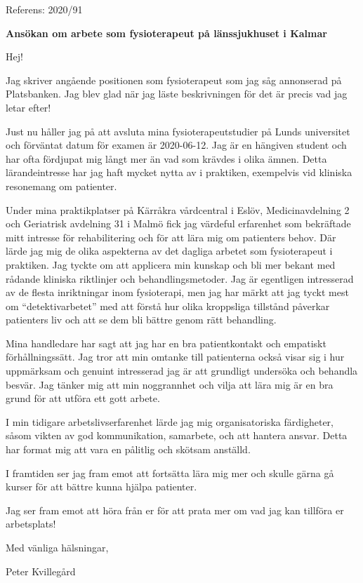 \documentclass[10pt,a4paper]{letter}
\begin{document}
 
	\begin{letter}{Referens: 2020/91} 
		
\opening{\textbf{Ansökan om arbete som fysioterapeut på länssjukhuset i Kalmar}}
Hej!

Jag skriver angående positionen som fysioterapeut som jag såg annonserad på Platsbanken. Jag blev glad när jag läste beskrivningen för det är precis vad jag letar efter!

Just nu håller jag på att avsluta mina fysioterapeutstudier på Lunds universitet och förväntat \mbox{datum} för examen är 2020-06-12. Jag är en hängiven student och har ofta fördjupat mig långt mer än vad som krävdes i olika ämnen. Detta lärande\-intresse har jag haft mycket nytta av i praktiken, exempelvis vid kliniska resonemang om patienter.

Under mina praktikplatser på Kärråkra vårdcentral i Eslöv, Medicinavdelning 2 och Geriatrisk avdelning 31 i Malmö fick jag värdeful erfarenhet som bekräftade mitt intresse för rehabilitering och för att lära mig om patienters behov. Där lärde jag mig de olika aspekterna av det dagliga arbetet som fysioterapeut i praktiken. Jag tyckte om att applicera min kunskap och bli mer bekant med rådande kliniska riktlinjer och behandlingsmetoder. Jag är egentligen intresserad av de flesta inriktningar inom fysioterapi, men jag har märkt att jag tyckt mest om ``detektivarbetet'' med att förstå hur olika kroppsliga tillstånd påverkar patienters liv och att se dem bli bättre genom rätt behandling.

Mina handledare har sagt att jag har en bra patientkontakt och empatiskt förhållningssätt. Jag tror att min omtanke till patienterna också visar sig i hur uppmärksam och genuint intresserad jag är att grundligt undersöka och behandla besvär. Jag tänker mig att min noggrannhet och vilja att lära mig är en bra grund för att utföra ett gott arbete.

I min tidigare arbetslivserfarenhet lärde jag mig organisatoriska färdigheter, såsom vikten av god kommunikation, samarbete, och att hantera ansvar. Detta har format mig att vara en pålitlig och skötsam anställd. 

I framtiden ser jag fram emot att fortsätta lära mig mer och skulle gärna gå kurser för att bättre kunna hjälpa patienter.

Jag ser fram emot att höra från er för att prata mer om vad jag kan tillföra er arbetsplats!
	
\vspace{1em}
\hspace{0.1\linewidth}Med vänliga hälsningar,

\hspace{0.1\linewidth}Peter Kvillegård
		 
 
\end{letter} 
\end{document}
